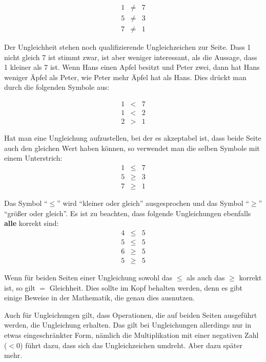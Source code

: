 \begin{eqnarray*}
1 &\neq & 7 \\
5 &\neq & 3 \\
7 &\neq & 1
\end{eqnarray*}

Der Ungleichheit stehen noch qualifizierende Ungleichzeichen zur Seite. Dass 1 nicht gleich 7 ist stimmt zwar, ist aber weniger interessant, als die Aussage, dass 1 kleiner als 7 ist. Wenn Hans einen Apfel besitzt und Peter zwei, dann hat Hans weniger Äpfel als Peter, wie Peter mehr Äpfel hat als Hans. Dies drückt man durch die folgenden Symbole aus:  

\begin{eqnarray*}
1 & < & 7 \\
1 & < & 2 \\
2 & > & 1
\end{eqnarray*}

Hat man eine Ungleichung aufzustellen, bei der es akzeptabel ist, dass beide Seite auch den gleichen Wert haben können, so verwendet man die selben Symbole mit einem Unterstrich:
\begin{eqnarray*}
1 & \le & 7 \\
5 & \ge & 3 \\
7 & \ge & 1
\end{eqnarray*}

Das Symbol "`$\le$"' wird "`kleiner oder gleich"'  ausgesprochen und das Symbol "`$\ge$"' "`größer oder gleich"'. Es ist zu beachten, dass folgende Ungleichungen ebenfalls \textbf{alle} korrekt sind:
\begin{eqnarray*}
4 & \le & 5 \\
5 & \le & 5 \\
6 & \ge & 5 \\
5 & \ge & 5
\end{eqnarray*}

Wenn für beiden Seiten einer Ungleichung sowohl das $\le$ als auch das $\ge$ korrekt ist, so gilt $=$ Gleichheit. Dies sollte im Kopf behalten werden, denn es gibt einige Beweise in der Mathematik, die genau dies ausnutzen.

Auch für Ungleichungen gilt, dass Operationen, die auf beiden Seiten ausgeführt werden, die Ungleichung erhalten. Das gilt bei Ungleichungen allerdings nur in etwas eingeschränkter Form, nämlich die Multiplikation mit einer negativen Zahl ($<0$) führt dazu, dass sich das Ungleichzeichen umdreht. Aber dazu später mehr.

